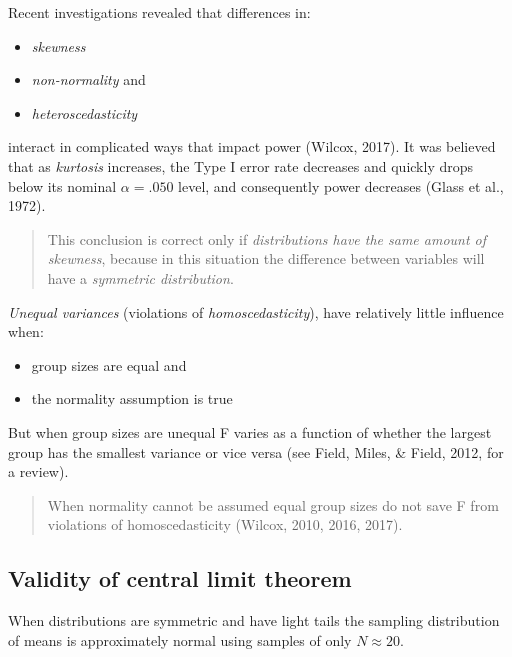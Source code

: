 \documentclass[
]{article}
\providecommand{\tightlist}{%
  \setlength{\itemsep}{0pt}\setlength{\parskip}{0pt}}
\begin{document}
Recent investigations revealed that differences in:

\begin{itemize}
\tightlist
\item
  \emph{skewness}
\item
  \emph{non-normality} and
\item
  \emph{heteroscedasticity}
\end{itemize}

interact in complicated ways that impact power (Wilcox, 2017). It was believed that as \emph{kurtosis} increases, the Type I error rate decreases and quickly drops below its nominal \(\alpha = .050\) level, and consequently power decreases (Glass et al., 1972).

\begin{quote}
This conclusion is correct only if \emph{distributions have the same amount of skewness}, because in this situation the difference between variables will have a \emph{symmetric distribution}.
\end{quote}

\emph{Unequal variances} (violations of \emph{homoscedasticity}), have relatively little influence when:

\begin{itemize}
\tightlist
\item
  group sizes are equal and
\item
  the normality assumption is true
\end{itemize}

But when group sizes are unequal F varies as a function of whether the largest group has the smallest variance or vice versa (see Field, Miles, \& Field, 2012, for a review).

\begin{quote}
When normality cannot be assumed equal group sizes do not save F from violations of homoscedasticity (Wilcox, 2010, 2016, 2017).
\end{quote}

\subsection*{Validity of central limit theorem}\label{validity-of-central-limit-theorem}

When distributions are symmetric and have light tails the sampling distribution of means is approximately normal using samples of only \(N \approx 20\).
\end{document}
